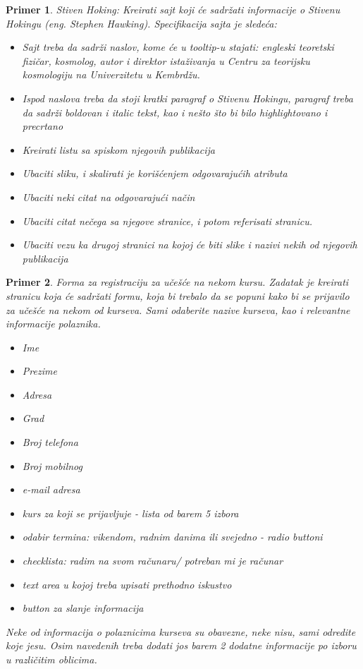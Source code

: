 \documentclass[a4paper]{article}
\newtheorem{primer}{Primer}[section]
\begin{document}
\begin{primer}
Stiven Hoking: Kreirati sajt koji će sadržati informacije o Stivenu Hokingu (eng. Stephen Hawking).
Specifikacija sajta je sledeća:
\begin{itemize}
\item Sajt treba da sadrži naslov, kome će u tooltip-u stajati: engleski teoretski fizičar, kosmolog, autor i direktor istaživanja u Centru za teorijsku kosmologiju na Univerzitetu u Kembrdžu.
\item Ispod naslova treba da stoji kratki paragraf o Stivenu Hokingu, paragraf treba da sadrži boldovan i italic tekst, kao i nešto što bi bilo highlightovano i precrtano
\item Kreirati listu sa spiskom njegovih publikacija
\item Ubaciti sliku, i skalirati je korišćenjem odgovarajućih atributa
\item Ubaciti neki citat na odgovarajući način
\item Ubaciti citat nečega sa njegove stranice, i potom referisati stranicu.
\item Ubaciti vezu ka drugoj stranici na kojoj će biti slike i nazivi nekih od njegovih publikacija
\end{itemize}
\end{primer}

\begin{primer}
Forma za registraciju za učešće na nekom kursu. Zadatak je kreirati stranicu koja će sadržati formu, koja bi trebalo da se popuni kako bi se prijavilo za učešće na nekom od kurseva. Sami odaberite nazive kurseva, kao i relevantne informacije polaznika.
\begin{itemize}
\item Ime
\item Prezime
\item Adresa
\item Grad
\item Broj telefona
\item Broj mobilnog
\item e-mail adresa
\item kurs za koji se prijavljuje - lista od barem 5 izbora
\item odabir termina: vikendom, radnim danima ili svejedno - radio buttoni
\item checklista: radim na svom računaru/ potreban mi je računar
\item text area u kojoj treba upisati prethodno iskustvo
\item button za slanje informacija
\end{itemize}
Neke od informacija o polaznicima kurseva su obavezne, neke nisu, sami odredite koje jesu. Osim navedenih treba dodati jos barem 2 dodatne informacije po izboru u različitim oblicima.
\end{primer}
\end{document}

